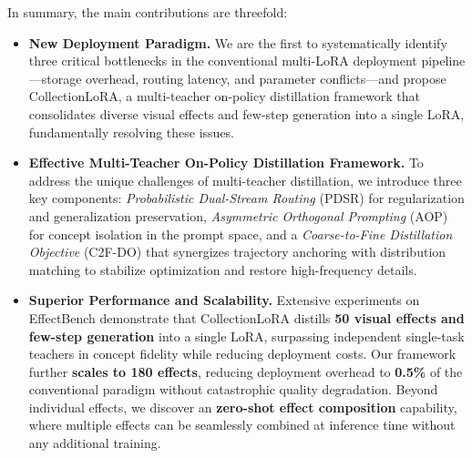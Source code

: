 In summary, the main contributions are threefold:
\vspace{-0.1cm}
\begin{itemize}
    \item \textbf{New Deployment Paradigm.} We are the first to systematically identify three critical bottlenecks in the conventional multi-LoRA deployment pipeline—storage overhead, routing latency, and parameter conflicts—and propose CollectionLoRA, a multi-teacher on-policy distillation framework that consolidates diverse visual effects and few-step generation into a single LoRA, fundamentally resolving these issues.

    \item \textbf{Effective Multi-Teacher On-Policy Distillation Framework.} To address the 
    unique challenges of multi-teacher distillation, we introduce 
    three key components: \textit{Probabilistic Dual-Stream Routing} (PDSR) for regularization and generalization preservation, \textit{Asymmetric 
    Orthogonal Prompting} (AOP) for concept isolation in the prompt space, and a 
    \textit{Coarse-to-Fine Distillation Objective} (C2F-DO) that synergizes 
    trajectory anchoring with distribution matching to stabilize optimization and restore high-frequency details.
    \item \textbf{Superior Performance and Scalability.} Extensive experiments on EffectBench demonstrate that CollectionLoRA distills \textbf{50 visual effects 
    and few-step generation} into a single LoRA, surpassing independent single-task teachers in concept fidelity while reducing deployment costs. Our framework further \textbf{scales to 180 effects}, reducing deployment overhead to 
    \textbf{0.5\%} of the conventional paradigm without catastrophic quality degradation. Beyond individual effects, we discover an \textbf{zero-shot effect composition} capability, where multiple effects can be seamlessly combined 
    at inference time without any additional training.
\end{itemize}




